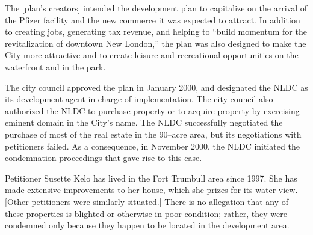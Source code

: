 The [plan's creators] intended the development plan to capitalize on the arrival
of the
Pfizer facility and the new commerce it was expected to attract. In addition to
creating jobs, generating tax revenue, and helping to ``build momentum for the
revitalization of downtown New London,'' the plan was also designed to make the
City more attractive and to create leisure and recreational opportunities on the
waterfront and in the park.

The city council approved the plan in January 2000, and designated the NLDC as
its development agent in charge of implementation. The city council also
authorized the NLDC to purchase property or to acquire property by exercising
eminent domain in the City's name. The NLDC successfully negotiated the purchase
of most of the real estate in the 90--acre area, but its negotiations with
petitioners failed. As a consequence, in November 2000, the NLDC initiated the
condemnation proceedings that gave rise to this case.



Petitioner Susette Kelo has lived in the Fort Trumbull area since 1997. She has
made extensive improvements to her house, which she prizes for its water view.
[Other petitioners were similarly situated.]
There is no allegation
that any of these properties is blighted or otherwise in poor condition; rather,
they were condemned only because they happen to be located in the development
area.

